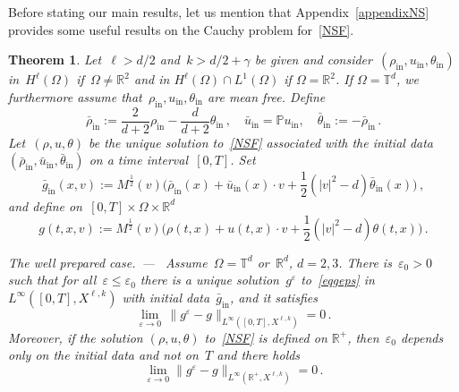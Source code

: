 \documentclass[11pt]{article}
\newtheorem{theo}{Theorem}[section]
\theoremstyle{definition}
\newcommand{\pointir}{.\ ---\ }
\numberwithin{equation}{section}
\numberwithin{figure}{section}
\numberwithin{table}{section}
\newcommand*\R {\mathbb{R}}
\newcommand*\T {\mathbb{T}}
\newcommand*\eps{{\varepsilon}}
\newcommand*\e{{\varepsilon}}
\DeclareMathOperator{\inn}{in}
\begin{document}
Before stating our main results, let us mention that Appendix~\ref{appendixNS} provides some useful results on the Cauchy problem for~\eqref{NSF}.
\begin{theo}\label{mainthmwp}
Let~$\ell>d/2$ and~{$k>d/2 +\gamma$} be given and consider~$(\rho_{\inn},u_{\inn},\theta_{\inn})$ in~$ H^\ell (\Omega)$ {if~$\Omega \neq \R^2$ and in $ H^\ell (\Omega) \cap L^1(\Omega)$ if $\Omega = \R^2$}. If $\Omega= \T^d$, we furthermore assume that~$\rho_{\inn},u_{\inn},\theta_{\inn}$ are mean free. Define
\begin{equation}\label{relationbarnotbar}
\bar \rho_{\inn}:= \frac2{d+2} \rho_{\inn}- \frac{d}{d+2} \theta_{\inn} \,, \quad \bar u_{\inn} = \mathbb{P} u_{\inn}, \quad \bar \theta_{\inn} := - \bar \rho_{\inn} \,.
\end{equation}
Let~$(\rho,u,\theta)$ be the unique solution to~\eqref{NSF} associated with the initial data~$(\bar \rho_{\inn},\bar u_{\inn},\bar \theta_{\inn})$ on a time interval~$[0,T]$. Set
\begin{equation}\label{defg0dataperiodi}
\bar g_{\inn}(x,v):=M^\frac12(v)\Big(\bar \rho_{\inn} (x) + \bar u_{\inn}(x) \cdot v + \frac12(|v|^2- d) \bar \theta_{\inn} (x)\Big)\,,
\end{equation}
and define on~$[0,T] \times \Omega \times \R^d$
\begin{equation}\label{defg0solution}
g (t,x,v) := M^\frac12(v)\Big(\rho (t,x) + u (t,x) \cdot v + \frac12(|v|^2- d) \theta(t,x) \Big)\,.
\end{equation}

\smallskip
\emph{The well prepared case}\pointir
Assume~$\Omega = \T^d$ or~$\R^d$, $d= 2,3$. There is~$\e_0>0$ such that for all~$\eps \le \eps_0$ there is a unique solution~$g^\e$ to~\eqref{eqgeps} in~$L^\infty([0,T],X^{\ell,k})$ with initial data~$\bar g_{\inn}$, and it satisfies
\begin{equation}\label{limgepsg0wp}
\lim_{\eps\to 0} \, \big\| g^\eps-g
\big\|_{L^\infty([0,T],X^{\ell,k})} = 0 \,.
\end{equation}
Moreover, if the solution $(\rho,u,\theta)$ to~\eqref{NSF} is defined on $\R^+$, then~$\eps_0$ depends only on the initial data and not on~$T$ and there holds
\[
\lim_{\eps\to 0} \big\| g^\eps-g \big\|_{L^\infty(\R^+,X^{\ell,k})} = 0 \,.
\]


\end{theo}
\end{document}
